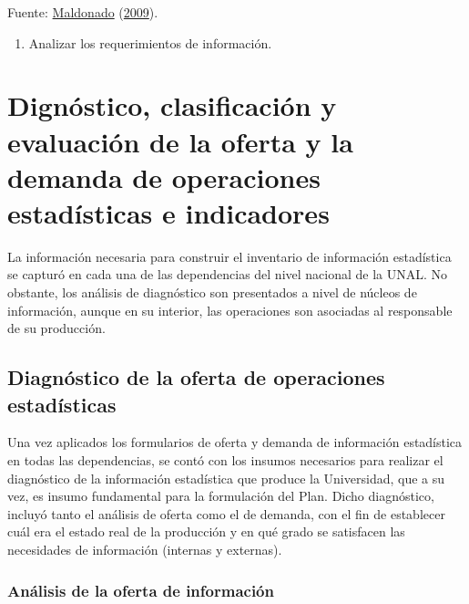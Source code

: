 \documentclass[
]{book}
\providecommand{\tightlist}{%
  \setlength{\itemsep}{0pt}\setlength{\parskip}{0pt}}
\begin{document}
Fuente: \protect\hyperlink{ref-maldonado2009metodologia}{Maldonado} (\protect\hyperlink{ref-maldonado2009metodologia}{2009}).

\begin{enumerate}
\def\labelenumi{\alph{enumi}.}
\setcounter{enumi}{2}
\tightlist
\item
  Analizar los requerimientos de información.
\end{enumerate}

\hypertarget{dignuxf3stico-clasificaciuxf3n-y-evaluaciuxf3n-de-la-oferta-y-la-demanda-de-operaciones-estaduxedsticas-e-indicadores}{%
\chapter{Dignóstico, clasificación y evaluación de la oferta y la demanda de operaciones estadísticas e indicadores}\label{dignuxf3stico-clasificaciuxf3n-y-evaluaciuxf3n-de-la-oferta-y-la-demanda-de-operaciones-estaduxedsticas-e-indicadores}}

La información necesaria para construir el inventario de información estadística se capturó en
cada una de las dependencias del nivel nacional de la UNAL. No obstante, los análisis de diagnóstico
son presentados a nivel de núcleos de información, aunque en su interior, las operaciones son
asociadas al responsable de su producción.

\hypertarget{diagnuxf3stico-de-la-oferta-de-operaciones-estaduxedsticas-1}{%
\section{Diagnóstico de la oferta de operaciones estadísticas}\label{diagnuxf3stico-de-la-oferta-de-operaciones-estaduxedsticas-1}}

Una vez aplicados los formularios de oferta y demanda de información estadística en todas las
dependencias, se contó con los insumos necesarios para realizar el diagnóstico de la información
estadística que produce la Universidad, que a su vez, es insumo fundamental para la formulación del
Plan. Dicho diagnóstico, incluyó tanto el análisis de oferta como el de demanda, con el fin de
establecer cuál era el estado real de la producción y en qué grado se satisfacen las necesidades de
información (internas y externas).

\hypertarget{anuxe1lisis-de-la-oferta-de-informaciuxf3n-1}{%
\subsection{Análisis de la oferta de información}\label{anuxe1lisis-de-la-oferta-de-informaciuxf3n-1}}
\end{document}
